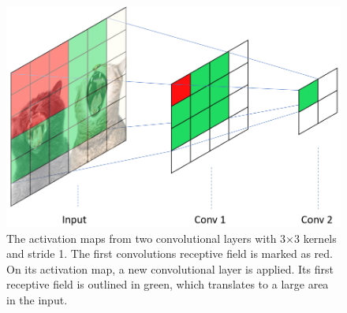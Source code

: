     \begin{figure}[H]
        \centering
        \includegraphics[scale=0.4]{figures/receptive_field.png}
        \caption[Receptive field]{The activation maps from two convolutional layers with 3×3 kernels and stride 1. The first convolutions receptive field is marked as red. On its activation map, a new convolutional layer is applied. Its first receptive field is outlined in green, which translates to a large area in the input.}
      	\medskip 
        \label{receptive_field_fig}
    \end{figure}

    
